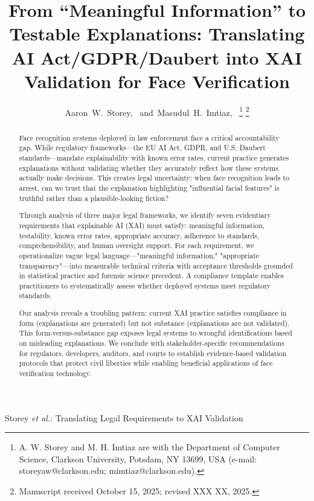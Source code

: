 \documentclass[journal]{IEEEtran}
\begin{document}
\title{From ``Meaningful Information'' to Testable Explanations: Translating AI Act/GDPR/Daubert into XAI Validation for Face Verification}

\author{Aaron~W.~Storey,~
        and~Masudul~H.~Imtiaz,~
\thanks{A. W. Storey and M. H. Imtiaz are with the Department of Computer Science, Clarkson University, Potsdam, NY 13699, USA (e-mail: storeyaw@clarkson.edu; mimtiaz@clarkson.edu).}
\thanks{Manuscript received October 15, 2025; revised XXX XX, 2025.}}

%
{Storey \MakeLowercase{\textit{et al.}}: Translating Legal Requirements to XAI Validation}

\maketitle

\begin{abstract}
Face recognition systems deployed in law enforcement face a critical accountability gap. While regulatory frameworks—the EU AI Act, GDPR, and U.S. Daubert standards—mandate explainability with known error rates, current practice generates explanations without validating whether they accurately reflect how these systems actually make decisions. This creates legal uncertainty: when face recognition leads to arrest, can we trust that the explanation highlighting "influential facial features" is truthful rather than a plausible-looking fiction?

Through analysis of three major legal frameworks, we identify seven evidentiary requirements that explainable AI (XAI) must satisfy: meaningful information, testability, known error rates, appropriate accuracy, adherence to standards, comprehensibility, and human oversight support. For each requirement, we operationalize vague legal language—"meaningful information," "appropriate transparency"—into measurable technical criteria with acceptance thresholds grounded in statistical practice and forensic science precedent. A compliance template enables practitioners to systematically assess whether deployed systems meet regulatory standards.

Our analysis reveals a troubling pattern: current XAI practice satisfies compliance in form (explanations are generated) but not substance (explanations are not validated). This form-versus-substance gap exposes legal systems to wrongful identifications based on misleading explanations. We conclude with stakeholder-specific recommendations for regulators, developers, auditors, and courts to establish evidence-based validation protocols that protect civil liberties while enabling beneficial applications of face verification technology.
\end{abstract}
\end{document}
